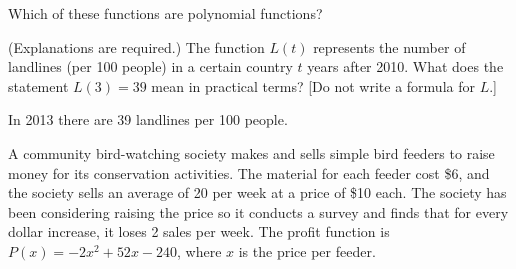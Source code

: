 \documentclass[11pt,answers]{exam}
\begin{document}
\begin{questions}
\question

Which of these functions are polynomial functions?

\question[2] (Explanations are required.) The function $L(t)$ represents the number of landlines (per 100 people)  in a certain country $t$ years after 2010. What does the statement $L(3)=39$ mean in practical terms? [Do not write a formula for $L$.]
\begin{solution}
In 2013 there are 39 landlines per 100 people.
\end{solution}

\newpage

\question A community bird-watching society makes and sells simple bird feeders to raise money for its conservation activities. The material for each feeder cost \$6, and the society sells an average of 20 per week at a price of \$10 each. The society has been considering raising the price so it conducts a survey and finds that for every dollar increase, it loses 2 sales per week. The profit function is $\displaystyle P(x)=-2 x^2+52 x-240$, where $x$ is the price per feeder.


\end{questions}
\end{document}
